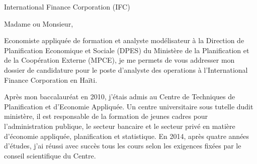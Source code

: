 \documentclass[12pt]{lettre}
\date{le  11 ao\^{u}t 2020}%
\begin{document}
\begin{letter}{
International Finance Corporation (IFC)
}
\address{
 Alexandro Disla\\
25, carefour Ism\'{e}, impasse F\'{e}n\'{e}lon\\
Pernier 23} 
\nofax{}
\signature{}
 
 
 
\opening{Madame ou Monsieur,}

Economiste appliqu\'{e}e de formation et analyste mod\'{e}lisateur
\`{a} la Direction de Planification Economique et Sociale (DPES) 
du Minist\`{e}re de la Planification et de la Coop\'{e}ration 
Externe (MPCE), je me permets de vous addresser mon dossier de candidature 
pour le poste d'analyste des operations \`{a} l'International Finance Corporation
en Ha\"{i}ti. 

Apr\`{e}s mon baccalaur\'{e}at en 2010, j'\'{e}tais admis au  Centre de Techniques
de Planification et d'Economie Appliqu\'{e}e. Un centre universitaire sous tutelle 
dudit minist\`{e}re, il est responsable de la formation de jeunes cadres pour 
l'administration publique, le secteur bancaire et le secteur  priv\'{e} 
en mati\`{e}re d'\'{e}conomie appliqu\'{e}e, planification et statistique. 
En 2014, apr\`{e}s quatre ann\'{e}es d'\'{e}tudes, j'ai r\'{e}ussi 
avec succ\`{e}s tous les cours selon les exigences fix\'{e}es
 par le conseil scientifique du Centre.


\end{letter}
\end{document}
